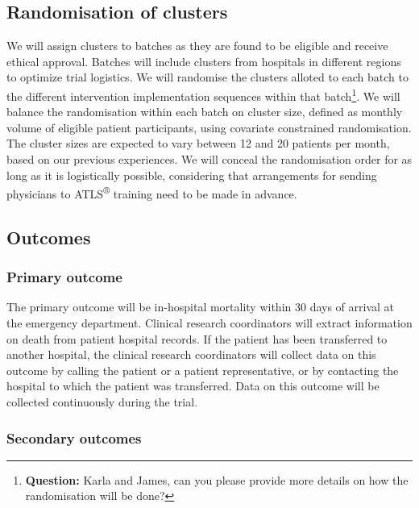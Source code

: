 \documentclass[
]{scrartcl}
\begin{document}
\hypertarget{randomisation-of-clusters}{%
\subsection{Randomisation of clusters}\label{randomisation-of-clusters}}

We will assign clusters to batches as they are found to be eligible and
receive ethical approval. Batches will include clusters from hospitals
in different regions to optimize trial logistics. We will randomise the
clusters alloted to each batch to the different intervention
implementation sequences within that batch\footnote{\textbf{Question:}
  Karla and James, can you please provide more details on how the
  randomisation will be done?}. We will balance the randomisation within
each batch on cluster size, defined as monthly volume of eligible
patient participants, using covariate constrained randomisation. The
cluster sizes are expected to vary between 12 and 20 patients per month,
based on our previous experiences. We will conceal the randomisation
order for as long as it is logistically possible, considering that
arrangements for sending physicians to ATLS\textsuperscript{®} training
need to be made in advance.

\hypertarget{outcomes}{%
\subsection{Outcomes}\label{outcomes}}

\hypertarget{primary-outcome}{%
\subsubsection{Primary outcome}\label{primary-outcome}}

The primary outcome will be in-hospital mortality within 30 days of
arrival at the emergency department. Clinical research coordinators will
extract information on death from patient hospital records. If the
patient has been transferred to another hospital, the clinical research
coordinators will collect data on this outcome by calling the patient or
a patient representative, or by contacting the hospital to which the
patient was transferred. Data on this outcome will be collected
continuously during the trial.

\hypertarget{secondary-outcomes}{%
\subsubsection{Secondary outcomes}\label{secondary-outcomes}}
\end{document}

